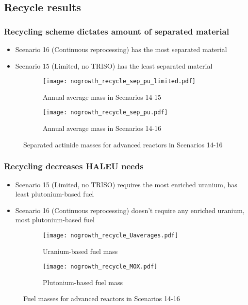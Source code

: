 \subsection{Recycle results}

\begin{frame}
    \frametitle{Recycling scheme dictates amount of separated material}
    \begin{itemize}
        \item Scenario 16 (Continuous reprocessing) has the 
              most separated material 
        \item Scenario 15 (Limited, no TRISO) has the least separated 
              material
    \end{itemize}
    \begin{figure}
        \centering
        \begin{subfigure}{0.495\textwidth}
            \texttt{[image: nogrowth\_recycle\_sep\_pu\_limited.pdf]}
            \caption{Annual average mass in Scenarios 14-15}
        \end{subfigure}
        \hfill
        \begin{subfigure}{0.495\textwidth}
            \texttt{[image: nogrowth\_recycle\_sep\_pu.pdf]}
            \caption{Annual average mass in Scenarios 14-16}
        \end{subfigure}
        \caption{Separated actinide masses for advanced reactors in Scenarios 14-16}
        \label{fig:recycle_sep_pu}
    \end{figure}
\end{frame}

\begin{frame}
    \frametitle{Recycling decreases HALEU needs}
    \begin{itemize}
        \item Scenario 15 (Limited, no TRISO) requires the most 
              enriched uranium, has least plutonium-based fuel
        \item Scenario 16 (Continuous reprocessing) doesn't 
              require any enriched uranium, most plutonium-based fuel
    \end{itemize}
    \begin{figure}
        \centering
        \begin{subfigure}{0.495\textwidth}
            \texttt{[image: nogrowth\_recycle\_Uaverages.pdf]}
            \caption{Uranium-based fuel mass}
        \end{subfigure}
        \hfill
        \begin{subfigure}{0.495\textwidth}
            \texttt{[image: nogrowth\_recycle\_MOX.pdf]}
            \caption{Plutonium-based fuel mass}
        \end{subfigure}
        \caption{Fuel masses for advanced reactors in Scenarios 14-16}
        \label{fig:recycle_fuel}
    \end{figure}
\end{frame}


